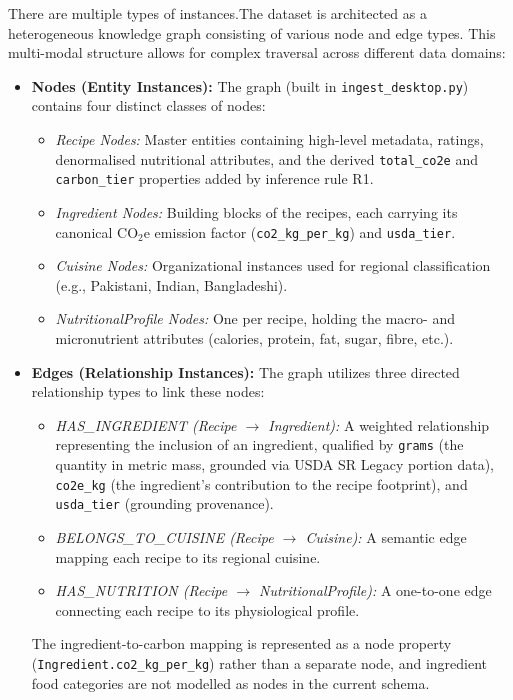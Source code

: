 \documentclass{article}
\begin{document}
There are multiple types of instances.The dataset is architected as a heterogeneous knowledge graph consisting of various node and edge types. This multi-modal structure allows for complex traversal across different data domains:
\begin{itemize}
    \item \textbf{Nodes (Entity Instances):} The graph (built in \texttt{ingest\_desktop.py})
    contains four distinct classes of nodes:
    \begin{itemize}
        \item \textit{Recipe Nodes:} Master entities containing high-level metadata, ratings,
        denormalised nutritional attributes, and the derived \texttt{total\_co2e} and
        \texttt{carbon\_tier} properties added by inference rule R1.
        \item \textit{Ingredient Nodes:} Building blocks of the recipes, each carrying its
        canonical CO$_2$e emission factor (\texttt{co2\_kg\_per\_kg}) and \texttt{usda\_tier}.
        \item \textit{Cuisine Nodes:} Organizational instances used for regional classification
        (e.g., Pakistani, Indian, Bangladeshi).
        \item \textit{NutritionalProfile Nodes:} One per recipe, holding the macro- and
        micronutrient attributes (calories, protein, fat, sugar, fibre, etc.).
    \end{itemize}
    \item \textbf{Edges (Relationship Instances):} The graph utilizes three directed
    relationship types to link these nodes:
    \begin{itemize}
        \item \textit{HAS\_INGREDIENT (Recipe $\rightarrow$ Ingredient):} A weighted relationship
        representing the inclusion of an ingredient, qualified by \texttt{grams} (the quantity in
        metric mass, grounded via USDA SR Legacy portion data), \texttt{co2e\_kg} (the ingredient's
        contribution to the recipe footprint), and \texttt{usda\_tier} (grounding provenance).
        \item \textit{BELONGS\_TO\_CUISINE (Recipe $\rightarrow$ Cuisine):} A semantic edge mapping
        each recipe to its regional cuisine.
        \item \textit{HAS\_NUTRITION (Recipe $\rightarrow$ NutritionalProfile):} A one-to-one edge
        connecting each recipe to its physiological profile.
    \end{itemize}
    The ingredient-to-carbon mapping is represented as a node property
    (\texttt{Ingredient.co2\_kg\_per\_kg}) rather than a separate node, and ingredient food
    categories are not modelled as nodes in the current schema.
\end{itemize}
\end{document}
